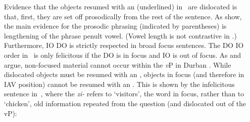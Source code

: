 \documentclass[output=paper]{LSP/langsci}
\begin{document}

Evidence that the objects resumed with an  (underlined) in~ are dislocated is that, first, they are set off prosodically from the rest of the sentence. 
As \citet{Chengetal2009Zulu} show, the main evidence for the prosodic phrasing (indicated by parentheses) is lengthening of the phrase penult vowel. 
(Vowel length is not contrastive in .) 
Furthermore, IO DO  is strictly respected in broad focus sentences. 
The DO IO order in~ is only felicitous if the DO is in focus and IO is out of focus. 
As \citet{Chengetal2009Zulu} and \citet{Kucerovaetal2012Against} argue, non-focused material cannot occur within the \textit{v}P in Durban .
While dislocated objects must be resumed with an , objects in focus (and therefore in IAV position) cannot be resumed with an . 
This is shown by the infelicitous sentence in~, where the  \textit{zi-} refers to ‘visitors’, the word in focus, rather than to ‘chicken’, old information repeated from the question (and dislocated out of the vP):
\end{document}
